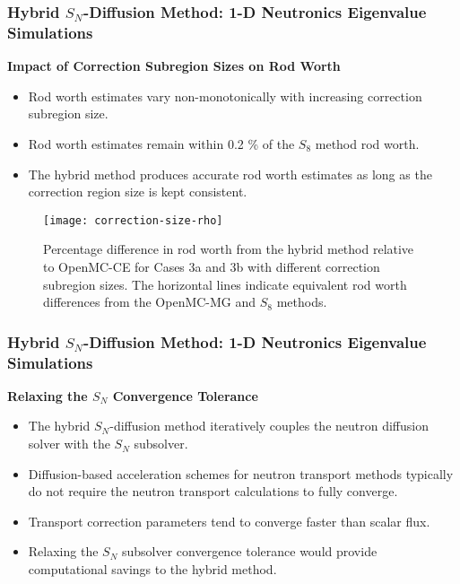 \begin{frame}
  \frametitle{Hybrid $S_N$-Diffusion Method: 1-D Neutronics Eigenvalue Simulations}
  \textbf{Impact of Correction Subregion Sizes on Rod Worth}
  \begin{itemize}
    \item Rod worth estimates vary non-monotonically with increasing correction subregion size.
    \item Rod worth estimates remain within 0.2 \% of the $S_8$ method rod worth.
    \item The hybrid method produces accurate rod worth estimates as long as the correction region
      size is kept consistent.
  \end{itemize}
  \begin{figure}[htb!]
    \centering
    \texttt{[image: correction-size-rho]}
    \caption{Percentage difference in rod worth from the hybrid method relative to OpenMC-CE for
      Cases 3a and 3b with different correction subregion sizes. The horizontal lines indicate
      equivalent rod worth differences from the OpenMC-MG and $S_8$ methods.}
    \label{fig:v1-size-rho}
  \end{figure}
\end{frame}

\begin{frame}
  \frametitle{Hybrid $S_N$-Diffusion Method: 1-D Neutronics Eigenvalue Simulations}
  \textbf{Relaxing the $S_N$ Convergence Tolerance}
  \begin{itemize}
    \item The hybrid $S_N$-diffusion method iteratively couples the neutron diffusion solver with
      the $S_N$ subsolver.
    \item Diffusion-based acceleration schemes for neutron transport methods typically do not
      require the neutron transport calculations to fully converge.
    \item Transport correction parameters tend to converge faster than scalar flux.
    \item Relaxing the $S_N$ subsolver convergence tolerance would provide computational savings to
      the hybrid method.
  \end{itemize}
\end{frame}

